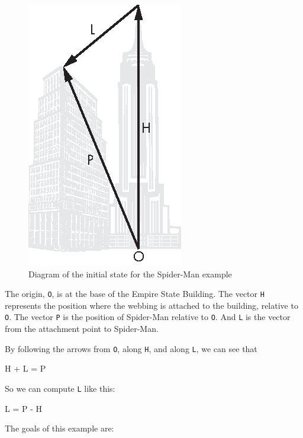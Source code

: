 \begin{figure}[H]
\includegraphics{book/images/figure14_01_new.eps}
\caption{Diagram of the initial state for the Spider-Man example}
\label{spiderman}
\end{figure}

The origin, \lstinline{O}, is at the base of the Empire State Building. The
vector \lstinline{H} represents the position where the webbing is attached
to the building, relative to \lstinline{O}. The vector \lstinline{P} is the
position of Spider-Man relative to \lstinline{O}. And \lstinline{L} is the
vector from the attachment point to Spider-Man.


By following the arrows from \lstinline{O}, along \lstinline{H}, and along
\lstinline{L}, we can see that

\begin{code}
H + L = P
\end{code}

So we can compute \lstinline{L} like this:

\begin{code}
L = P - H
\end{code}

The goals of this example are:

